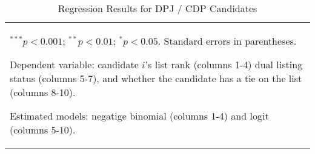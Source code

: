 \begin{table}
\begin{center}
\begin{tabular}{l c c c c c c c c c c}
\hline
\multicolumn{11}{l}{\scriptsize{\item $^{***}p<0.001$; $^{**}p<0.01$; $^{*}p<0.05$. Standard errors in parentheses.
\item Dependent variable: candidate $i$'s list rank (columns 1-4) dual listing status (columns 5-7), and whether the candidate has a tie on the list (columns 8-10).
\item Estimated models: negatige binomial (columns 1-4) and logit (columns 5-10).}}
\end{tabular}
\caption{Regression Results for DPJ / CDP Candidates}
\label{tab:dpj_cdp}
\end{center}
\end{table}
